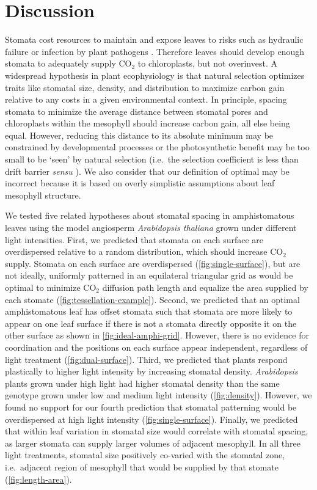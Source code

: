\documentclass[webpdf,large,modern,unnumsec,namedate]{oup-authoring-template}
\begin{document}
\section{Discussion}\label{discussion}

Stomata cost resources to maintain \citep{deans_optimization_2020} and
expose leaves to risks such as hydraulic failure
\citep{wang_theoretical_2020} or infection by plant pathogens
\citep{melotto_stomatal_2017}. Therefore leaves should develop enough
stomata to adequately supply CO\(_2\) to chloroplasts, but not
overinvest. A widespread hypothesis in plant ecophysiology is that
natural selection optimizes traits like stomatal size, density, and
distribution to maximize carbon gain relative to any costs in a given
environmental context. In principle, spacing stomata to minimize the
average distance between stomatal pores and chloroplasts within the
mesophyll should increase carbon gain, all else being equal. However,
reducing this distance to its absolute minimum may be constrained by
developmental processes or the photosynthetic benefit may be too small
to be `seen' by natural selection (i.e.~the selection coefficient is
less than drift barrier \emph{sensu} \citet{sung_drift-barrier_2012}).
We also consider that our definition of optimal may be incorrect because
it is based on overly simplistic assumptions about leaf mesophyll
structure.

We tested five related hypotheses about stomatal spacing in
amphistomatous leaves using the model angiosperm \emph{Arabidopsis
thaliana} grown under different light intensities. First, we predicted
that stomata on each surface are overdispersed relative to a random
distribution, which should increase CO\(_2\) supply. Stomata on each
surface are overdispersed (\autoref{fig:single-surface}), but are not
ideally, uniformly patterned in an equilateral triangular grid as would
be optimal to minimize CO\(_2\) diffusion path length and equalize the
area supplied by each stomate (\autoref{fig:tessellation-example}).
Second, we predicted that an optimal amphistomatous leaf has offset
stomata such that stomata are more likely to appear on one leaf surface
if there is not a stomata directly opposite it on the other surface as
shown in \autoref{fig:ideal-amphi-grid}. However, there is no evidence
for coordination and the positions on each surface appear independent,
regardless of light treatment (\autoref{fig:dual-surface}). Third, we
predicted that plants respond plastically to higher light intensity by
increasing stomatal density. \emph{Arabidopsis} plants grown under high
light had higher stomatal density than the same genotype grown under low
and medium light intensity (\autoref{fig:density}). However, we found no
support for our fourth prediction that stomatal patterning would be
overdispersed at high light intensity (\autoref{fig:single-surface}).
Finally, we predicted that within leaf variation in stomatal size would
correlate with stomatal spacing, as larger stomata can supply larger
volumes of adjacent mesophyll. In all three light treatments, stomatal
size positively co-varied with the stomatal zone, i.e.~adjacent region
of mesophyll that would be supplied by that stomate
(\autoref{fig:length-area}).
\end{document}

